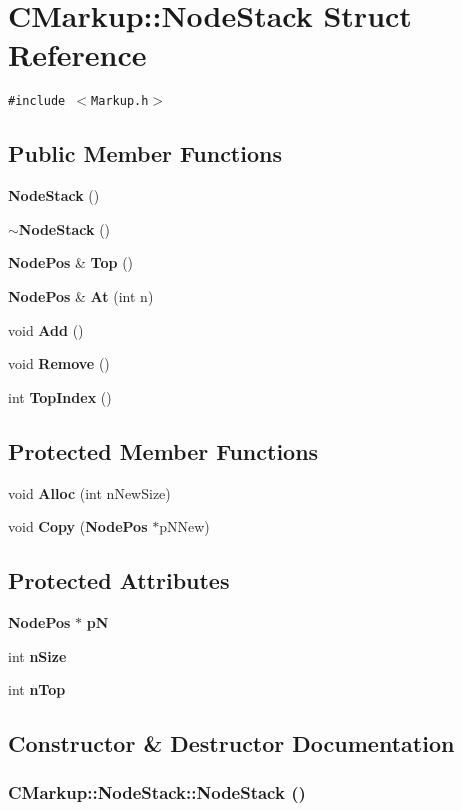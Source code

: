 \section{CMarkup::NodeStack Struct Reference}
\label{structCMarkup_1_1NodeStack}
{\tt \#include $<$Markup.h$>$}

\subsection*{Public Member Functions}
\begin{CompactItemize}
\item 
{\bf NodeStack} ()
\item 
{\bf $\sim$NodeStack} ()
\item 
{\bf NodePos} \& {\bf Top} ()
\item 
{\bf NodePos} \& {\bf At} (int n)
\item 
void {\bf Add} ()
\item 
void {\bf Remove} ()
\item 
int {\bf TopIndex} ()
\end{CompactItemize}
\subsection*{Protected Member Functions}
\begin{CompactItemize}
\item 
void {\bf Alloc} (int nNewSize)
\item 
void {\bf Copy} ({\bf NodePos} $\ast$pNNew)
\end{CompactItemize}
\subsection*{Protected Attributes}
\begin{CompactItemize}
\item 
{\bf NodePos} $\ast$ {\bf pN}
\item 
int {\bf nSize}
\item 
int {\bf nTop}
\end{CompactItemize}


\subsection{Constructor \& Destructor Documentation}
\subsubsection[NodeStack]{\setlength{\rightskip}{0pt plus 5cm}CMarkup::NodeStack::NodeStack ()\hspace{0.3cm}{\tt  [inline]}}\label{structCMarkup_1_1NodeStack_de0c540ed4a133345e7c8ec6e05b0b11}




